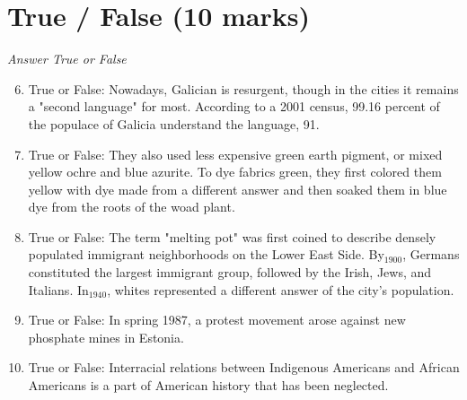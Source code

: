 \documentclass[12pt]{article}
\begin{document}
\section*{True / False (10 marks)}
\textit{Answer True or False}
\begin{enumerate}[label=\arabic*.]
\setcounter{enumi}{5}
\item True or False: Nowadays, Galician is resurgent, though in the cities it remains a "second language" for most. According to a 2001 census, 99.16 percent of the populace of Galicia understand the language, 91.
\item True or False: They also used less expensive green earth pigment, or mixed yellow ochre and blue azurite. To dye fabrics green, they first colored them yellow with dye made from a different answer and then soaked them in blue dye from the roots of the woad plant.
\item True or False: The term "melting pot" was first coined to describe densely populated immigrant neighborhoods on the Lower East Side. By$_{1900}$, Germans constituted the largest immigrant group, followed by the Irish, Jews, and Italians. In$_{1940}$, whites represented a different answer of the city's population.
\item True or False: In spring 1987, a protest movement arose against new phosphate mines in Estonia.
\item True or False: Interracial relations between Indigenous Americans and African Americans is a part of American history that has been neglected.
\end{enumerate}
\end{document}
